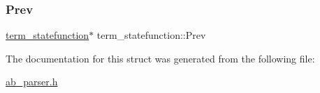 \mbox{\label{structterm__statefunction_a2693cbcd59a8a1eea7cbc1f8a61efc83}} 
\subsubsection{\texorpdfstring{Prev}{Prev}}
{\footnotesize\ttfamily \hyperlink{structterm__statefunction}{term\+\_\+statefunction}$\ast$ term\+\_\+statefunction\+::\+Prev}



The documentation for this struct was generated from the following file\+:\begin{DoxyCompactItemize}
\item 
\hyperlink{ab__parser_8h}{ab\+\_\+parser.\+h}\end{DoxyCompactItemize}
